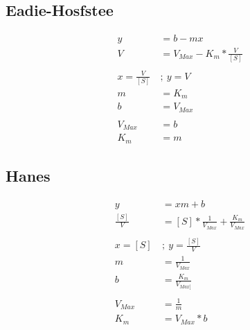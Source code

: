 \subsection{Eadie-Hosfstee}

\begin{align*}
    y &= b - mx
    \\
    V  &= V_{Max} - K_{m} * \frac{V}{[S]}
    \\
    \\
    x = \frac{V}{[S]} \ &; \ y = V
    \\
    m &= K_{m}
    \\
    b &= V_{Max}
    \\
    \\
    V_{Max} &= b
    \\
    K_{m} &= m
\end{align*}

\subsection{Hanes}

\begin{align*}
    y &= xm+b
    \\
    \frac{[S]}{V}  &= [S] * \frac{1}{V_{Max}} + \frac{K_{m}}{V_{Max}}
    \\
    \\
    x = [S] \ &; \ y = \frac{[S]}{V}
    \\
    m &= \frac{1}{V_{Max}}
    \\
    b &= \frac{K_{m}}{V_{Max]}}
    \\
    \\
    V_{Max} &= \frac{1}{m}
    \\
    K_{m} &= V_{Max} * b
\end{align*}

